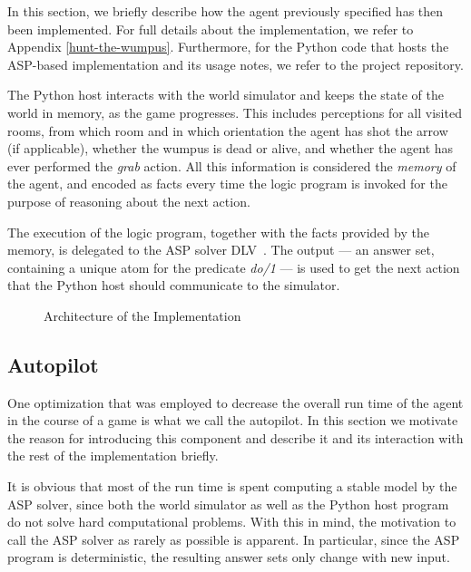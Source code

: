 \documentclass{llncs}
\begin{document}
In this section, we briefly describe how the agent previously specified has then been implemented.
For full details about the implementation, we refer to Appendix \ref{hunt-the-wumpus}.
Furthermore, for the Python code that hosts the ASP-based implementation and its usage notes, we refer to the project repository.

The Python host interacts with the world simulator and keeps the state of the world in memory, as the game progresses. This includes perceptions for all visited rooms, from which room and in which orientation the agent has shot the arrow (if applicable), whether the wumpus is dead or alive, and whether the agent has ever performed the \emph{grab} action. All this information is considered the \emph{memory} of the agent, and encoded as facts every time the logic program is invoked for the purpose of reasoning about the next action.

The execution of the logic program, together with the facts provided by the memory, is delegated to the ASP solver DLV~\cite{DLV-system}.
The output --- an answer set, containing a unique atom for the predicate \emph{do/1} --- is used to get the next action that the Python host should communicate to the simulator.

\begin{figure}
\begin{center}

\end{center}
\caption{Architecture of the Implementation}
\label{fig:architecture}
\end{figure}

\subsection{Autopilot}

One optimization that was employed to decrease the overall run time of the agent in the course of a game is what we call the autopilot. In this section we motivate the reason for introducing this component and describe it and its interaction with the rest of the implementation briefly.

It is obvious that most of the run time is spent computing a stable model by the ASP solver, since both the world simulator as well as the Python host program do not solve hard computational problems. With this in mind, the motivation to call the ASP solver as rarely as possible is apparent. In particular, since the ASP program is deterministic, the resulting answer sets only change with new input.
\end{document}
